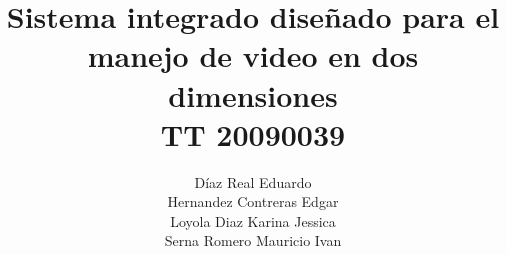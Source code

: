 \documentclass[openbib,letter]{report}
\title{
Sistema integrado dise\~nado para el manejo de video en dos dimensiones
\\
TT 20090039
}
\author{
D\'iaz Real Eduardo\\
Hernandez Contreras Edgar\\
Loyola Diaz Karina Jessica\\
Serna Romero Mauricio Ivan\\
}
\begin{document}
\maketitle

\tableofcontents

























\nocite{*}
\end{document}
